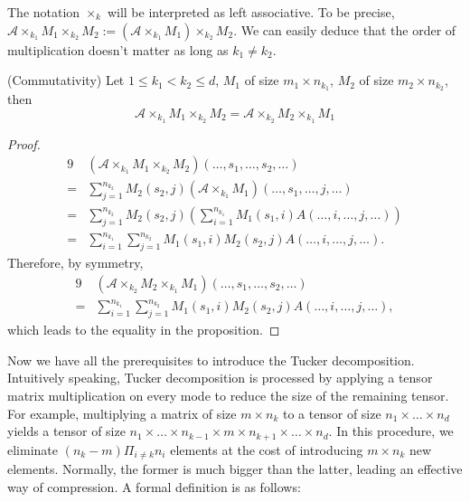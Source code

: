 \documentclass[12pt]{article}
\begin{document}
\begin{mynot}
The notation $\times_k$ will be interpreted as left associative. To be precise, $\mathcal{A} \times_{k_1} M_1 \times_{k_2} M_2 := (\mathcal{A} \times_{k_1} M_1) \times_{k_2} M_2 $. We can easily deduce that the order of multiplication doesn't matter as long as $k_1 \neq k_2$.
 \end{mynot}

\begin{myprop}{(Commutativity)}
Let $1 \leq k_1 < k_2 \leq d$, $M_1$ of size $m_1 \times n_{k_1}$, $M_2$ of size $m_2 \times n_{k_2}$, then 
$$\mathcal{A} \times_{k_1} M_1 \times_{k_2} M_2 = \mathcal{A} \times_{k_2} M_2 \times_{k_1} M_1$$
\end{myprop}
\begin{proof}
\begin{alignat*}{9}
& (\mathcal{A} \times_{k_1} M_1 \times_{k_2} M_2)(\dots, s_1, \dots, s_2, \dots) \\
= & \sum_{j = 1}^{n_{k_2}} M_2(s_2, j) (\mathcal{A} \times_{k_1} M_1)(\dots, s_1, \dots, j, \dots) \\
= & \sum_{j = 1}^{n_{k_2}} M_2(s_2, j) ( \sum_{i = 1}^{n_{k_1}} M_1(s_1, i) A(\dots, i, \dots, j, \dots) ) \\
= & \sum_{i = 1}^{n_{k_1}} \sum_{j = 1}^{n_{k_2}} M_1(s_1, i) M_2(s_2, j) A(\dots, i, \dots, j, \dots) .
\end{alignat*}
Therefore, by symmetry, 
\begin{alignat*}{9}
&( \mathcal{A} \times_{k_2} M_2 \times_{k_1} M_1 ) ( \dots, s_1, \dots, s_2, \dots ) \\
= & \sum_{i = 1}^{n_{k_1}} \sum_{j = 1}^{n_{k_2}} M_1(s_1, i) M_2(s_2, j) A(\dots, i, \dots, j, \dots),
\end{alignat*}
which leads to the equality in the proposition.
\end{proof}

Now we have all the prerequisites to introduce the Tucker decomposition. Intuitively speaking, Tucker decomposition is processed by applying a tensor matrix multiplication on every mode to reduce the size of the remaining tensor. For example, multiplying a matrix of size $m \times n_k$ to a tensor of size $n_1 \times \dots \times n_d$ yields a tensor of size $n_1 \times \dots \times n_{k-1} \times m \times n_{k+1} \times \dots \times n_d$. In this procedure, we eliminate $(n_k - m)\Pi_{i \neq k} n_i$ elements at the cost of introducing $m \times n_k$ new elements. Normally, the former is much bigger than the latter, leading an effective way of compression. A formal definition is as follows:
\end{document}
